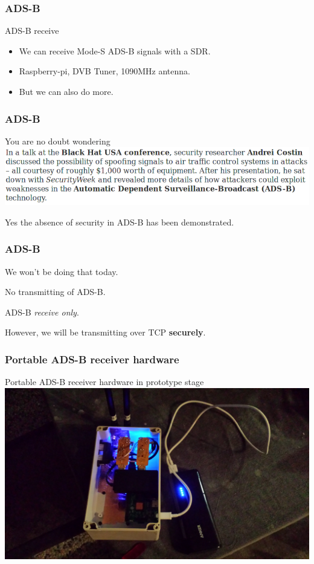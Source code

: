 \begin{frame}
\frametitle{ADS-B}
\begin{block}{ADS-B receive}
\begin{itemize}
\item<1-> We can receive Mode-S ADS-B signals with a SDR.
\item<2-> Raspberry-pi, DVB Tuner, 1090MHz antenna.
\item<3-> But we can also do more.
\end{itemize}
\end{block}
\end{frame}

\begin{frame}
\frametitle{ADS-B}
\begin{block}{You are no doubt wondering}
\includegraphics[height=0.18\textheight]{image/adsb-security.png}
\end{block}
Yes the absence of security in ADS-B has been demonstrated.
\end{frame}

\begin{frame}
\frametitle{ADS-B}
\begin{center}
We won't be doing that today.
\par
No transmitting of ADS-B.
\par
ADS-B \emph{receive only}.
\par
However, we will be transmitting over TCP \textbf{securely}.
\end{center}
\end{frame}

\begin{frame}
\frametitle{Portable ADS-B receiver hardware}
\begin{block}{Portable ADS-B receiver hardware in prototype stage}
\includegraphics[height=0.5\textheight]{image/adsb-hardware-prototype.png}
\end{block}
\end{frame}

